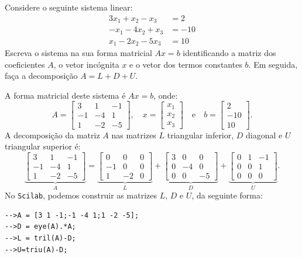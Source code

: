 \begin{ex}\label{ex:sislin}
  Considere o seguinte sistema linear:
  \begin{align*}
    3x_1 + x_2 - x_3 &= 2\\
    -x_1 -4x_2 + x_3 &= -10\\
    x_1 - 2x_2 - 5x_3 &= 10
  \end{align*}
Escreva o sistema na sua forma matricial $Ax = b$ identificando a matriz dos coeficientes $A$, o vetor incógnita $x$ e o vetor dos termos constantes $b$. Em seguida, faça a decomposição $A = L + D + U$.
\end{ex}
\begin{sol}
 A forma matricial deste sistema é $Ax = b$, onde:
\begin{equation*}
  A =
  \begin{bmatrix}
    3 & 1 & -1\\
    -1 & -4 & 1\\
    1 & -2 & -5
  \end{bmatrix},\quad
  x =
  \begin{bmatrix}
    x_1\\
    x_2\\
    x_3
  \end{bmatrix}\quad\text{e}\quad
  b =
  \begin{bmatrix}
    2\\
    -10\\
    10
  \end{bmatrix}.
\end{equation*}
A decomposição da matriz $A$ nas matrizes $L$ triangular inferior, $D$ diagonal e $U$ triangular superior é:
\begin{equation*}
  \underbrace{\begin{bmatrix}
    3 & 1 & -1\\
    -1 & -4 & 1\\
    1 & -2 & -5
  \end{bmatrix}}_{A} =
  \underbrace{\begin{bmatrix}
    0 & 0 & 0\\
    -1 & 0 & 0\\
    1 & -2 & 0
  \end{bmatrix}}_{L} +
  \underbrace{\begin{bmatrix}
    3 & 0 & 0\\
    0 & -4 & 0\\
    0 & 0 & -5
  \end{bmatrix}}_{D} + 
  \underbrace{\begin{bmatrix}
    0 & 1 & -1\\
    0 & 0 & 1\\
    0 & 0 & 0
  \end{bmatrix}}_{U}.
\end{equation*}
\ifisscilab
No \verb+Scilab+, podemos construir as matrizes $L$, $D$ e $U$, da seguinte forma:
\begin{verbatim}
-->A = [3 1 -1;-1 -4 1;1 -2 -5];
-->D = eye(A).*A;
-->L = tril(A)-D;
-->U=triu(A)-D;
\end{verbatim}
\fi  
\end{sol}

